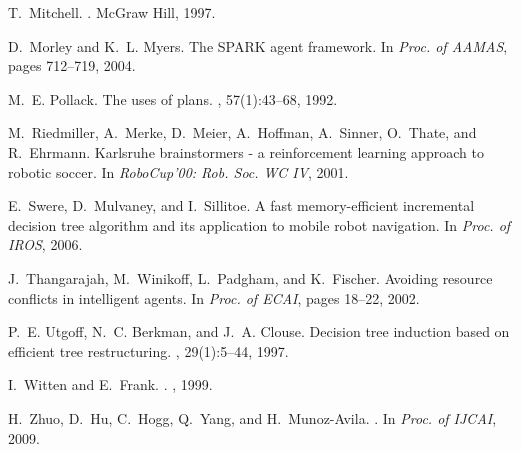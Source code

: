 \documentclass{aamas2010_cameraReady}
\begin{document}
\begin{thebibliography}{10}
T.~Mitchell.
.
\newblock McGraw Hill, 1997.

D.~Morley and K.~L. Myers.
\newblock The {SPARK} agent framework.
\newblock In {\em Proc. of AAMAS}, pages 712--719, 2004.

M.~E. Pollack.
\newblock The uses of plans.
, 57(1):43--68, 1992.

M.~Riedmiller, A.~Merke, D.~Meier, A.~Hoffman, A.~Sinner, O.~Thate, and
  R.~Ehrmann.
\newblock Karlsruhe brainstormers - a reinforcement learning approach to
  robotic soccer.
\newblock In {\em {RoboCup'00}: Rob. Soc. WC {IV}}, 2001.

E.~Swere, D.~Mulvaney, and I.~Sillitoe.
\newblock A fast memory-efficient incremental decision tree algorithm and its
  application to mobile robot navigation.
\newblock In {\em Proc. of IROS}, 2006.

J.~Thangarajah, M.~Winikoff, L.~Padgham, and K.~Fischer.
\newblock Avoiding resource conflicts in intelligent agents.
\newblock In {\em Proc. of ECAI}, pages 18--22, 2002.

P.~E. Utgoff, N.~C. Berkman, and J.~A. Clouse.
\newblock Decision tree induction based on efficient tree restructuring.
, 29(1):5--44, 1997.

I.~Witten and E.~Frank.
.
, 1999.

H.~Zhuo, D.~Hu, C.~Hogg, Q.~Yang, and H.~Munoz-Avila.
.
\newblock In {\em Proc. of IJCAI}, 2009.

\end{thebibliography}




%
%

\end{document}
